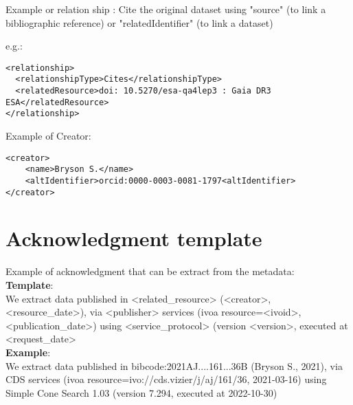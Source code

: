 \documentclass[11pt,a4paper]{ivoa}
\begin{document}
Example or relation ship : 
Cite the original dataset using "source" (to link a bibliographic reference) or "relatedIdentifier" (to link a dataset)

e.g.:
\begin{verbatim}
<relationship>
  <relationshipType>Cites</relationshipType>
  <relatedResource>doi: 10.5270/esa-qa4lep3 : Gaia DR3 ESA</relatedResource> 
</relationship>
\end{verbatim}

Example of Creator:
\begin{verbatim}
<creator>
	<name>Bryson S.</name>
	<altIdentifier>orcid:0000-0003-0081-1797<altIdentifier>
</creator>
\end{verbatim}

%

\section{Acknowledgment template}

Example of acknowledgment that can be extract from the metadata:\\

\textbf{Template}:\\
We extract data published in <related\_resource> (<creator>, <resource\_date>),
via <publisher> services (ivoa resource=<ivoid>, <publication\_date>)
using <service\_protocol> (version <version>, executed at <request\_date>\\


\textbf{Example}:\\
We extract data published in bibcode:2021AJ....161...36B (Bryson S., 2021),
via CDS services (ivoa resource=ivo://cds.vizier/j/aj/161/36, 2021-03-16)
using Simple Cone Search 1.03 (version 7.294, executed at 2022-10-30)



\appendix
\end{document}
